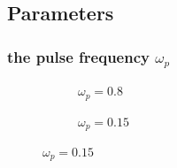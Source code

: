\documentclass{beamer}
\begin{document}
\subsection*{Parameters}
\begin{frame}[fragile]
\frametitle{the pulse frequency $\omega_{p}$}
\begin{figure}
\begin{subfigure}{0.48\textwidth}
\caption{$\omega_{p}=0.8$}
\end{subfigure}
\begin{subfigure}{0.48\textwidth}
\caption{$\omega_{p}=0.15$}
\end{subfigure}
\end{figure}
\end{frame}
\end{document}
